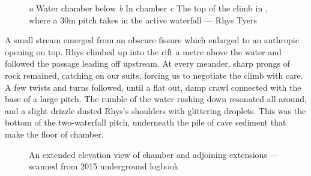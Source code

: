     \begin{figure}[t!]
        \checkoddpage \ifoddpage \forcerectofloat \else \forceversofloat \fi
        \centering
        \begin{subfigure}[t]{0.68\textwidth}
            \centering
            \caption{}\label{water chamber below helm's deep}
        \end{subfigure}
        \hfill
        \begin{subfigure}[t]{0.303\textwidth}
            \centering
            \caption{} \label{HelmsDeep}
        \end{subfigure}

        \vspace{0.3cm}
        
        \begin{subfigure}[t]{\textwidth}
            \centering
            \caption{} \label{Touching the Void 1}
        \end{subfigure}
        
        \caption{
            \emph{a} Water chamber below \protect{}
            \emph{b} In \protect{} chamber
            \emph{c} The top of the climb in \protect{}, where a 30m pitch takes in the active waterfall --- Rhys Tyers 
        }
    \end{figure}

    A small stream emerged from an obscure fissure which enlarged to an anthropic opening on top. Rhys climbed up into the rift a metre above the water and followed the passage leading off upstream. At every meander, sharp prongs of rock remained, catching on our suits, forcing us to negotiate the climb with care. A few twists and turns followed, until a flat out, damp crawl connected with the base of a large pitch. The rumble of the water rushing down resonated all around, and a slight drizzle dusted Rhys's shoulders with glittering droplets. This was the bottom of the two-waterfall pitch, underneath the pile of  cave sediment that make the floor of  chamber. 

    \begin{figure}[t!]
        \checkoddpage \ifoddpage \forcerectofloat \else \forceversofloat \fi
        \centering

        \caption{An extended elevation view of \protect{} chamber and adjoining \protect{} extensions ---scanned from 2015 underground logbook}
        \label{helms deep}
         
    \end{figure}

